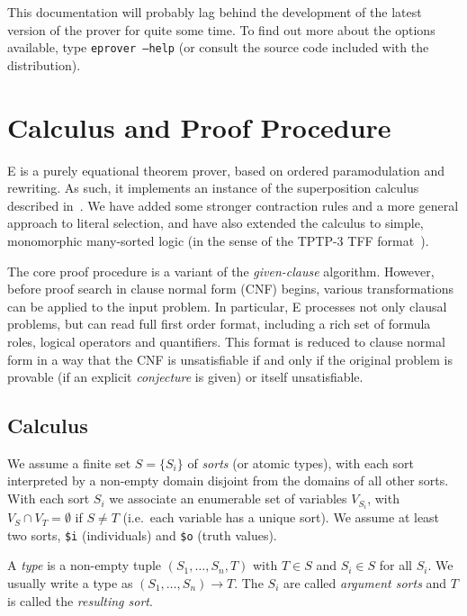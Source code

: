\documentclass{report}
\begin{document}
This documentation will probably lag behind the development of the
latest version of the prover for quite some time. To find out more
about the options available, type \texttt{eprover --help} (or consult
the source code included with the distribution).



\chapter{Calculus and Proof Procedure}
\label{sec:calculus}

E is a purely equational theorem prover, based on ordered
paramodulation and rewriting. As such, it implements an instance of
the superposition calculus described in~\cite{BG94}. We have added
some stronger contraction rules and a more general approach to literal
selection, and have also extended the calculus to simple, monomorphic
many-sorted logic (in the sense of the TPTP-3 TFF
format~\cite{SSCB:LPAR-2012}).

The core proof procedure is a variant of the \emph{given-clause}
algorithm. However, before proof search in clause normal form (CNF)
begins, various transformations can be applied to the input
problem. In particular, E processes not only clausal problems, but can
read full first order format, including a rich set of formula roles,
logical operators and quantifiers. This format is reduced to clause
normal form in a way that the CNF is unsatisfiable if and only if the
original problem is provable (if an explicit \emph{conjecture} is
given) or itself unsatisfiable.


\section{Calculus}

We assume a finite set $S=\{S_i\}$ of \emph{sorts}
(or atomic types), with each sort interpreted by a non-empty domain
disjoint from the domains of all other sorts. With each sort $S_i$ we
associate an enumerable set of variables $V_{S_i}$, with
$V_S\cap V_T = \emptyset$ if $S\not=T$ (i.e.\ each variable has a
unique sort). We assume at least two sorts, \texttt{\$i} (individuals)
and \texttt{\$o} (truth values).

A \emph{type} is a non-empty tuple $(S_1, \ldots, S_n, T)$
with $T\in S$ and $S_i \in S$ for all $S_i$. We usually write a type
as $(S_1, \ldots, S_n) \to T$. The $S_i$ are called \emph{argument
  sorts} and $T$ is called the \emph{resulting sort}.
\end{document}
